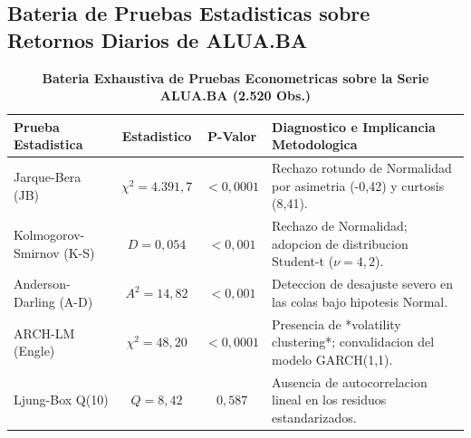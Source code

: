\documentclass[10pt,a4paper]{article}
\theoremstyle{definition}
\begin{document}
\subsection{Bateria de Pruebas Estadisticas sobre Retornos Diarios de ALUA.BA}
\begin{table}[H]
\centering
\caption{\textbf{Bateria Exhaustiva de Pruebas Econometricas sobre la Serie ALUA.BA (2.520 Obs.)}}
\small
\begin{tabular}{lccl}
\toprule
\textbf{Prueba Estadistica} & \textbf{Estadistico} & \textbf{P-Valor} & \textbf{Diagnostico e Implicancia Metodologica} \\
\midrule
Jarque-Bera (JB) & $\chi^2 = 4.391,7$ & $< 0,0001$ & Rechazo rotundo de Normalidad por asimetria (-0,42) y curtosis (8,41). \\
Kolmogorov-Smirnov (K-S) & $D = 0,054$ & $< 0,001$ & Rechazo de Normalidad; adopcion de distribucion Student-t ($\nu = 4,2$). \\
Anderson-Darling (A-D) & $A^2 = 14,82$ & $< 0,001$ & Deteccion de desajuste severo en las colas bajo hipotesis Normal. \\
ARCH-LM (Engle) & $\chi^2 = 48,20$ & $< 0,0001$ & Presencia de *volatility clustering*; convalidacion del modelo GARCH(1,1). \\
Ljung-Box Q(10) & $Q = 8,42$ & $0,587$ & Ausencia de autocorrelacion lineal en los residuos estandarizados. \\
\bottomrule
\end{tabular}
\end{table}
\end{document}

